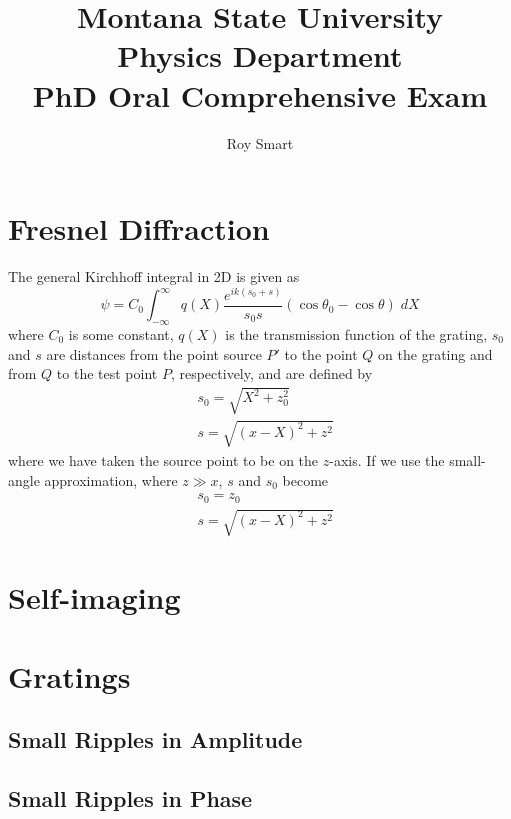 \documentclass[10pt,letterpaper]{article}
\author{Roy Smart}
\title{Montana State University \\ Physics Department \\ PhD Oral Comprehensive Exam}
\begin{document}
	
	\maketitle
	
	\tableofcontents
	
	\section{Fresnel Diffraction}
	
		The general Kirchhoff integral in 2D is given as
		\begin{equation}
			\psi = C_0 \int_{-\infty}^{\infty} q(X) \frac{e^{i k (s_0 + s)}}{s_0 s} (\cos \theta_0 - \cos \theta) \; dX 
		\end{equation}
		where $C_0$ is some constant, $q(X)$ is the transmission function of the grating, $s_0$ and $s$ are distances from the point source $P'$ to the point $Q$ on the grating and from $Q$ to the test point $P$, respectively, and are defined by
		\begin{equation}
			\begin{split}
				&s_0 = \sqrt{X^2 + z_0^2} \\
				&s = \sqrt{(x-X)^2 + z^2} 
			\end{split}
		\end{equation}
		where we have taken the source point to be on the $z$-axis. If we use the small-angle approximation, where $z \gg x$, $s$ and $s_0$ become
		\begin{equation}
			\begin{split}
				&s_0 = z_0 \\
				&s = \sqrt{(x-X)^2 + z^2} 
			\end{split}
		\end{equation}
	
	\section{Self-imaging}
	\section{Gratings}
		\subsection{Small Ripples in Amplitude}
		\subsection{Small Ripples in Phase}
	
\end{document}
